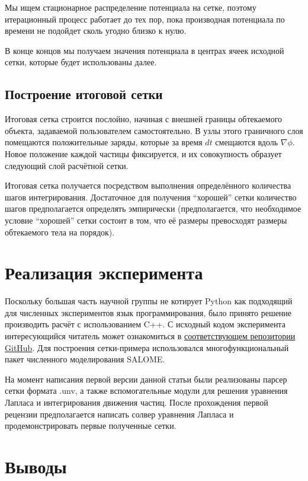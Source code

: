 \documentclass[a4paper,12pt]{article}
\begin{document}
Мы ищем стационарное распределение потенциала на сетке, поэтому итерационный процесс работает до тех пор, пока производная потенциала по времени не подойдет сколь угодно близко к нулю.

В конце концов мы получаем значения потенциала в центрах ячеек исходной сетки, которые будет использованы далее.

\subsection{Построение итоговой сетки}

Итоговая сетка строится послойно, начиная с внешней границы обтекаемого объекта, задаваемой пользователем самостоятельно. В узлы этого граничного слоя помещаются положительные заряды, которые за время $dt$ смещаются вдоль $\nabla \phi$. Новое положение каждой частицы фиксируется, и их совокупность образует следующий слой расчётной сетки.

Итоговая сетка получается посредством выполнения определённого количества шагов интегрирования. Достаточное для получения “хорошей” сетки количество шагов предполагается определять эмпирически (предполагается, что необходимое условие “хорошей” сетки состоит в том, что её размеры превосходят размеры обтекаемого тела на порядок).

\section{Реализация эксперимента}

Поскольку большая часть научной группы не котирует Python как подходящий для численных экспериментов язык программирования, было принято решение производить расчёт с использованием C++. С исходный кодом эксперимента интересующийся читатель может ознакомиться в \href{https://github.com/d-qql/FlowMeshBuilder}{соответствующем репозитории GitHub}. Для построения сетки-примера использовался многофункциональный пакет численного моделирования SALOME.

На момент написания первой версии данной статьи были реализованы парсер сетки формата .unv, а также вспомогательные модули для решения уравнения Лапласа и интегрирования движения частиц. После прохождения первой рецензии предполагается написать солвер уравнения Лапласа и продемонстрировать первые полученные сетки.

\section{Выводы}
\end{document}
